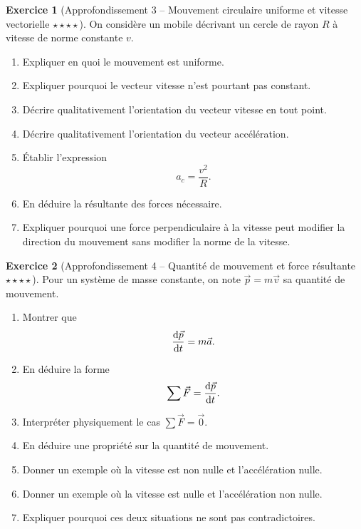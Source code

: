 \documentclass[11pt,a4paper]{article}
\theoremstyle{definition}
\newtheorem{exercice}{Exercice}[section]
\newcommand{\etoiles}[1]{\hfill{\small\textbf{#1}}}
\begin{document}
\begin{exercice}[Approfondissement 3 -- Mouvement circulaire uniforme et vitesse vectorielle \etoiles{$\star\star\star\star$}]
On considère un mobile décrivant un cercle de rayon $R$ à vitesse de norme constante $v$.

\begin{enumerate}[label=\arabic*.]
    \item Expliquer en quoi le mouvement est uniforme.
    \item Expliquer pourquoi le vecteur vitesse n’est pourtant pas constant.
    \item Décrire qualitativement l’orientation du vecteur vitesse en tout point.
    \item Décrire qualitativement l’orientation du vecteur accélération.
    \item Établir l’expression
    \[
    a_c=\frac{v^2}{R}.
    \]
    \item En déduire la résultante des forces nécessaire.
    \item Expliquer pourquoi une force perpendiculaire à la vitesse peut modifier la direction du mouvement
    sans modifier la norme de la vitesse.
\end{enumerate}
\end{exercice}

\begin{exercice}[Approfondissement 4 -- Quantité de mouvement et force résultante \etoiles{$\star\star\star\star$}]
Pour un système de masse constante, on note $\vec{p}=m\vec{v}$ sa quantité de mouvement.

\begin{enumerate}[label=\arabic*.]
    \item Montrer que
    \[
    \dv{\vec{p}}{t}=m\vec{a}.
    \]
    \item En déduire la forme
    \[
    \sum \vec{F}=\dv{\vec{p}}{t}.
    \]
    \item Interpréter physiquement le cas $\sum \vec{F}=\vec{0}$.
    \item En déduire une propriété sur la quantité de mouvement.
    \item Donner un exemple où la vitesse est non nulle et l’accélération nulle.
    \item Donner un exemple où la vitesse est nulle et l’accélération non nulle.
    \item Expliquer pourquoi ces deux situations ne sont pas contradictoires.
\end{enumerate}
\end{exercice}
\end{document}
